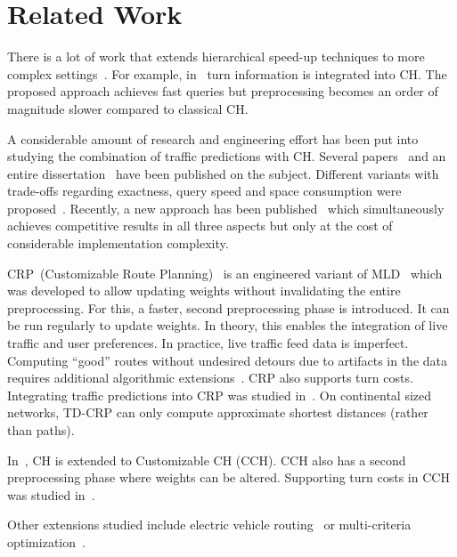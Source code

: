 \documentclass[manuscript,review]{acmart}
\begin{document}
\section{Related Work}\label{sec:related_work}

There is a lot of work that extends hierarchical speed-up techniques to more complex settings~\cite{bdgmpsww-rptn-16}.
For example, in~\cite{gv-errnt-11} turn information is integrated into CH.
The proposed approach achieves fast queries but preprocessing becomes an order of magnitude slower compared to classical CH.

A considerable amount of research and engineering effort has been put into studying the combination of traffic predictions with CH.
Several papers~\cite{bdsv-tdch-09,bgns-tdcha-10,klsv-dtdch-10,bgsv-mtdtt-13} and an entire dissertation~\cite{b-tdrpc-14} have been published on the subject.
Different variants with trade-offs regarding exactness, query speed and space consumption were proposed~\cite{bgsv-mtdtt-13}.
Recently, a new approach has been published~\cite{swz-sfert-20} which simultaneously achieves competitive results in all three aspects but only at the cost of considerable implementation complexity.

CRP~(Customizable Route Planning)~\cite{dgpw-crprn-13} is an engineered variant of MLD~\cite{swz-umlgt-02} which was developed to allow updating weights without invalidating the entire preprocessing.
For this, a faster, second preprocessing phase is introduced.
It can be run regularly to update weights.
In theory, this enables the integration of live traffic and user preferences.
In practice, live traffic feed data is imperfect.
Computing ``good'' routes without undesired detours due to artifacts in the data requires additional algorithmic extensions~\cite{dss-tarrn-18}.
CRP also supports turn costs.
Integrating traffic predictions into CRP was studied in~\cite{bdpw-dtdrp-16}.
On continental sized networks, TD-CRP can only compute approximate shortest distances (rather than paths).

In~\cite{dsw-cch-15}, CH is extended to Customizable CH (CCH).
CCH also has a second preprocessing phase where weights can be altered.
Supporting turn costs in CCH was studied in~\cite{bwzz-cchtc-20}.

Other extensions studied include electric vehicle routing~\cite{DBLP:journals/algorithmica/BaumDPSWZ20,DBLP:conf/aaai/EisnerFS11} or multi-criteria optimization~\cite{fns-opca-14,gks-rpfof-10}.
\end{document}
